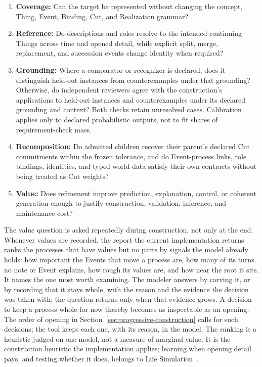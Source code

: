 \documentclass[11pt,a4paper]{article}
\begin{document}
\begin{enumerate}
  \item \textbf{Coverage:} Can the target be represented without changing the
    concept, Thing, Event, Binding, Cut, and Realization grammar?
  \item \textbf{Reference:} Do descriptions and roles resolve to the intended
    continuing Things across time and opened detail, while explicit split,
    merge, replacement, and succession events change identity when required?
  \item \textbf{Grounding:} Where a comparator or recognizer is declared, does it
    distinguish held-out instances from counterexamples under that grounding?
    Otherwise, do independent reviewers agree with
    the construction's applications to held-out instances and counterexamples
    under its declared grounding and context? Both checks retain unresolved
    cases. Calibration applies only to declared
    probabilistic outputs, not to fit shares of requirement-check mass.
  \item \textbf{Recomposition:} Do admitted children recover their parent's
    declared Cut commitments within the frozen tolerance, and do Event-process
    links, role bindings, identities, and typed world data satisfy their own
    contracts without being treated as Cut weights?
  \item \textbf{Value:} Does refinement improve prediction, explanation,
    control, or coherent generation enough to justify construction,
    validation, inference, and maintenance cost?
\end{enumerate}

The value question is asked repeatedly during construction, not only at the end.
Whenever values are recorded, the report the current implementation returns ranks
the processes that have values but no parts by signals the model already holds: how important the
Events that move a process are, how many of its turns no note or Event explains,
how rough its values are, and how near the root it sits. It names the one most
worth examining. The modeler answers by carving it, or by recording that it stays
whole, with the reason and the evidence the decision was taken with; the question
returns only when that evidence grows. A decision to keep a process whole for
now thereby becomes as inspectable as an opening. The order of opening in
Section~\ref{sec:progressive-construction} calls for such decisions; the tool
keeps each one, with its reason, in the model. The ranking is a
heuristic judged on one model, not a measure of marginal value. It is the
construction heuristic the implementation applies; learning when opening detail
pays, and testing whether it does, belongs to Life
Simulation~\cite{westerbergLifeSimulation2026}.
\end{document}
